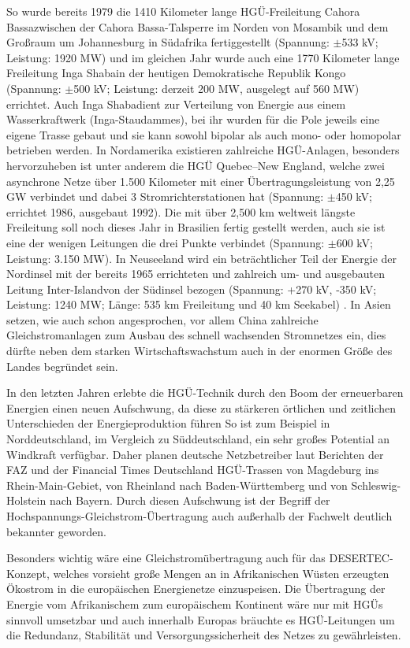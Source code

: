 So wurde bereits 1979 die 1410 Kilometer lange HGÜ-Freileitung \q Cahora Bassa\qe zwischen der Cahora Bassa-Talsperre im Norden von Mosambik und dem Großraum um Johannesburg in Südafrika fertiggestellt (Spannung: $\pm$533 kV; Leistung: 1920 MW)
und im gleichen Jahr wurde auch eine 1770 Kilometer lange Freileitung \q Inga Shaba\qe in der heutigen Demokratische Republik Kongo (Spannung: $\pm$500 kV; Leistung: derzeit 200 MW, ausgelegt auf 560 MW) errichtet\cite{Schymroch}.
Auch \q Inga Shaba\qe dient zur Verteilung von Energie aus einem Wasserkraftwerk (Inga-Staudammes),
bei ihr wurden für die Pole jeweils eine eigene Trasse gebaut und sie kann sowohl bipolar als auch mono- oder homopolar betrieben werden\cite{Schymroch}.
In Nordamerika existieren zahlreiche HGÜ-Anlagen, besonders hervorzuheben ist unter anderem die HGÜ Quebec–New England, welche zwei asynchrone Netze über 1.500 Kilometer mit einer Übertragungsleistung von 2,25 GW verbindet und dabei 3 Stromrichterstationen hat (Spannung: $\pm$450 kV; errichtet 1986, ausgebaut 1992)\cite{Liste}.
Die mit über 2,500 km weltweit längste Freileitung soll noch dieses Jahr in Brasilien fertig gestellt werden, auch sie ist eine der wenigen Leitungen die drei Punkte verbindet (Spannung: $\pm$600 kV; Leistung: 3.150 MW). %
In Neuseeland wird ein beträchtlicher Teil der Energie der Nordinsel mit der bereits 1965 errichteten und zahlreich um- und ausgebauten Leitung \q Inter-Island\qe von der Südinsel bezogen (Spannung: +270 kV, -350 kV; Leistung: 1240 MW; Länge: 535 km Freileitung und 40 km Seekabel) \cite{Schymroch}\cite{Liste}.
In Asien setzen, wie auch schon angesprochen, vor allem China zahlreiche Gleichstromanlagen zum Ausbau des schnell wachsenden Stromnetzes ein, dies dürfte neben dem starken Wirtschaftswachstum auch in der enormen Größe des Landes begründet sein.

In den letzten Jahren erlebte die HGÜ-Technik durch den Boom der erneuerbaren Energien einen neuen Aufschwung, da diese zu stärkeren örtlichen und zeitlichen Unterschieden der Energieproduktion führen
So ist zum Beispiel in Norddeutschland, im Vergleich zu Süddeutschland, ein sehr großes Potential an Windkraft verfügbar. Daher planen deutsche Netzbetreiber laut Berichten der FAZ und der Financial Times Deutschland HGÜ-Trassen von Magdeburg ins Rhein-Main-Gebiet, von Rheinland nach Baden-Württemberg und von Schleswig-Holstein nach Bayern.\cite{FAZ1}\cite{FAZ2}\cite{FinancialTimes}
Durch diesen Aufschwung ist der Begriff der Hochspannungs-Gleichstrom-Übertragung auch außerhalb der Fachwelt deutlich bekannter geworden.

Besonders wichtig wäre eine Gleichstromübertragung auch für das DESERTEC-Konzept, welches vorsieht große Mengen an in Afrikanischen Wüsten erzeugten Ökostrom in die europäischen Energienetze einzuspeisen. Die Übertragung der Energie vom Afrikanischem zum europäischem Kontinent wäre nur mit HGÜs sinnvoll umsetzbar und auch innerhalb Europas bräuchte es HGÜ-Leitungen um die Redundanz, Stabilität und Versorgungssicherheit des Netzes zu gewährleisten.\cite{TRANS-CSP}

